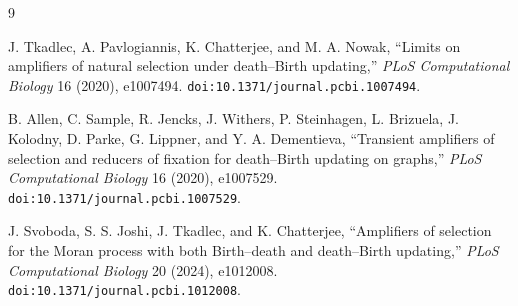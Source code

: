 \documentclass[11pt]{article}
\begin{document}
\begin{thebibliography}{9}

J. Tkadlec, A. Pavlogiannis, K. Chatterjee, and M. A. Nowak,
``Limits on amplifiers of natural selection under death--Birth updating,''
\emph{PLoS Computational Biology} 16 (2020), e1007494.
\texttt{doi:10.1371/journal.pcbi.1007494}.

B. Allen, C. Sample, R. Jencks, J. Withers, P. Steinhagen, L. Brizuela,
J. Kolodny, D. Parke, G. Lippner, and Y. A. Dementieva,
``Transient amplifiers of selection and reducers of fixation for death--Birth
updating on graphs,'' \emph{PLoS Computational Biology} 16 (2020), e1007529.
\texttt{doi:10.1371/journal.pcbi.1007529}.

J. Svoboda, S. S. Joshi, J. Tkadlec, and K. Chatterjee,
``Amplifiers of selection for the Moran process with both Birth--death and
death--Birth updating,'' \emph{PLoS Computational Biology} 20 (2024), e1012008.
\texttt{doi:10.1371/journal.pcbi.1012008}.

\end{thebibliography}
\end{document}
